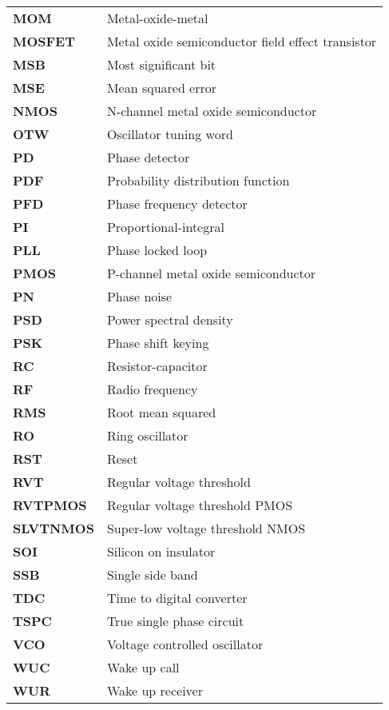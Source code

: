 	\FloatBarrier\pagebreak
	{\renewcommand*{\arraystretch}{1.10}\large
	\begin{tabular}{@{}ll}
		\textbf{\textsf{MOM}}	&	Metal-oxide-metal \\
		\textbf{\textsf{MOSFET}}	&	Metal oxide semiconductor field effect transistor \\
		\textbf{\textsf{MSB}}	&	Most significant bit \\
		\textbf{\textsf{MSE}}	&	Mean squared error \\
		\textbf{\textsf{NMOS}}	&	N-channel metal oxide semiconductor \\
		\textbf{\textsf{OTW}}	&	Oscillator tuning word \\
		\textbf{\textsf{PD}}	&	Phase detector \\
		\textbf{\textsf{PDF}}	&	Probability distribution function \\
		\textbf{\textsf{PFD}}	&	Phase frequency detector \\
		\textbf{\textsf{PI}}	&	Proportional-integral \\
		\textbf{\textsf{PLL}}	&	Phase locked loop \\
		\textbf{\textsf{PMOS}}	&	P-channel metal oxide semiconductor \\
		\textbf{\textsf{PN}}	&	Phase noise \\
		\textbf{\textsf{PSD}}	&	Power spectral density \\
		\textbf{\textsf{PSK}}	&	Phase shift keying \\
		\textbf{\textsf{RC}}	&	Resistor-capacitor \\
		\textbf{\textsf{RF}}	&	Radio frequency \\
		\textbf{\textsf{RMS}}	&	Root mean squared \\
		\textbf{\textsf{RO}}	&	Ring oscillator \\
		\textbf{\textsf{RST}}	&	Reset \\
		\textbf{\textsf{RVT}}	&	Regular voltage threshold \\
		\textbf{\textsf{RVTPMOS}}	&	Regular voltage threshold PMOS \\
		\textbf{\textsf{SLVTNMOS}}	&	Super-low voltage threshold NMOS \\
		\textbf{\textsf{SOI}}	&	Silicon on insulator \\
		\textbf{\textsf{SSB}}	&	Single side band \\
		\textbf{\textsf{TDC}}	&	Time to digital converter \\
		\textbf{\textsf{TSPC}}	&	True single phase circuit \\
		\textbf{\textsf{VCO}}	&	Voltage controlled oscillator \\
		\textbf{\textsf{WUC}}	&	Wake up call \\
		\textbf{\textsf{WUR}}	&	Wake up receiver \\
	\end{tabular}}
